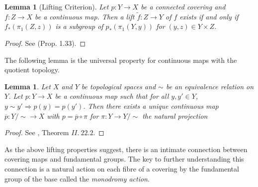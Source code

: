 \documentclass{article}
\theoremstyle{plain}
\newtheorem{lemma}[theorem]{Lemma}
\theoremstyle{definition}
\begin{document}
\begin{lemma}[Lifting Criterion]
\label{lift_criterion}
    Let $p:Y\rightarrow X$ be a connected covering and $f:Z\rightarrow X$ be a continuous map. Then a lift $\widetilde{f}: Z \rightarrow Y$ of $f$ exists if and only if $f_*(\pi_1(Z,z))$ is a subgroup of $p_*(\pi_1(Y,y))$ for $(y,z)\in Y\times Z$.
\end{lemma}
\begin{proof}
    See \cite{Hartshorne}(Prop. 1.33).
\end{proof}

\noindent The following lemma is the universal property for continuous maps with the quotient topology.
\begin{lemma}
\label{univ_ppty_lift}
    Let $X$ and $Y$ be topological spaces and $\sim$ be an equivalence relation on $Y$.
    Let $p:Y\rightarrow X$ be a continuous map such that for all $y,y'\in Y$, $y\sim y' \Rightarrow p(y)=p(y')$.
    Then there exists a unique continuous map $\overline{p}: Y/\sim \rightarrow X$ with $p=\overline{p} \circ \pi$ for $\pi:Y\rightarrow Y/\sim$ the natural projection
\end{lemma}
\begin{proof}
    See \cite{munkrs}, Theorem $II.\:22.2$.
\end{proof}



\noindent As the above lifting properties suggest, there is an intimate connection between covering maps and fundamental groups. The key to further understanding this connection is a natural action on each fibre of a covering by the fundamental group of the base called the \textit{monodromy action}.
\end{document}
